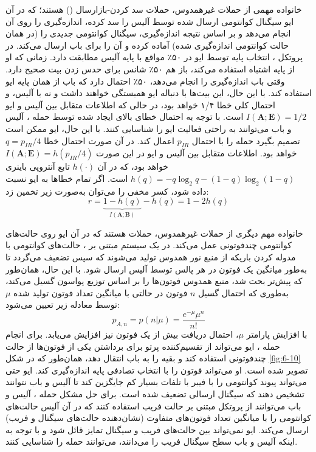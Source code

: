 خانواده مهمی از حملات غیرهمدوس، حملات سد کردن-بازارسال () هستند؛ که در آن ایو سیگنال کوانتومی ارسال شده توسط آلیس را سد کرده، اندازه‌گیری را روی آن انجام می‌دهد و بر اساس نتیجه اندازه‌گیری، سیگنال کوانتومی جدیدی را (در همان  حالت کوانتومی اندازه‌گیری شده) آماده کرده و آن را برای باب ارسال می‌کند. در پروتکل ، انتخاب پایه توسط ایو در ۵۰٪ مواقع با پایه آلیس مطابقت دارد. زمانی که او از پایه اشتباه استفاده می‌کند، باز هم ۵۰٪ شانس برای حدس زدن بیت صحیح دارد. وقتی باب اندازه‌گیری را انجام می‌دهد، ۵۰٪ احتمال دارد که باب از همان پایه ایو استفاده کند. با این حال، این بیت‌ها با دنباله ایو همبستگی خواهند داشت و نه با آلیس، و احتمال کلی خطا ۱/۴ خواهد بود، در حالی که اطلاعات متقابل بین آلیس و ایو $I(\bm{A}; \bm{E}) = 1/2$ است. با توجه به احتمال خطای بالای ایجاد شده توسط حمله ، آلیس و باب می‌توانند به راحتی فعالیت ایو را شناسایی کنند. با این حال، ایو ممکن است تصمیم بگیرد حمله  را با احتمال $p_{IR}$ اعمال کند. در آن صورت احتمال خطا $q = p_{IR}/4$ خواهد بود. اطلاعات متقابل بین آلیس و ایو در این صورت $I(\bm{A}; \bm{E}) = h(p_{IR}/4)$ خواهد بود، که در آن $h(\cdot)$ تابع آنتروپی باینری $h(q) = -q \log_2 q - (1-q) \log_2 (1-q)$ است. اگر تمام خطاها به ایو نسبت داده شود، کسر مخفی را می‌توان به‌صورت زیر تخمین زد:
\begin{equation}
	r = \underbrace{1 - h(q)}_{I(\bm{A}; \bm{B})} - h(q) = 1 - 2h(q)
	\label{eq:6-28}
\end{equation}

خانواده مهم دیگری از حملات غیرهمدوس، حملات  هستند \cite{51} که در آن ایو روی حالت‌های کوانتومی چندفوتونی عمل می‌کند. در یک سیستم  مبتنی بر ، حالت‌های کوانتومی با مدوله کردن باریکه از منبع نور همدوس تولید می‌شوند که سپس تضعیف می‌گردد تا به‌طور میانگین یک فوتون در هر پالس توسط آلیس ارسال شود. با این حال، همان‌طور که پیش‌تر بحث شد، منبع همدوس فوتون‌ها را بر اساس توزیع پواسون گسیل می‌کند، به‌طوری که احتمال گسیل $n$ فوتون در حالتی با میانگین تعداد فوتون تولید شده $\mu$ توسط معادله زیر تعیین می‌شود:
\begin{equation}
	p_{A,n} = p(n|\mu) = \frac{e^{-\mu} \mu^n}{n!}
	\label{eq:6-29}
\end{equation}
با افزایش پارامتر $\mu$، احتمال دریافت بیش از یک فوتون نیز افزایش می‌یابد. برای انجام حمله ، ایو می‌تواند از تقسیم‌کننده پرتو برای برداشتن یکی از فوتون‌ها از حالت چندفوتونی استفاده کند و بقیه را به باب انتقال دهد، همان‌طور که در شکل \ref{fig:6-10} تصویر شده است. او می‌تواند فوتون را با انتخاب تصادفی پایه اندازه‌گیری کند. ایو حتی می‌تواند پیوند کوانتومی را با فیبر با تلفات بسیار کم جایگزین کند تا آلیس و باب نتوانند تشخیص دهند که سیگنال ارسالی تضعیف شده است. برای حل مشکل حمله ، آلیس و باب می‌توانند از پروتکل مبتنی بر حالت فریب \cite{37} استفاده کنند که در آن آلیس حالت‌های کوانتومی را با میانگین تعداد فوتون‌های متفاوت (نشان‌دهنده حالت‌های سیگنال و فریب) ارسال می‌کند. ایو نمی‌تواند بین حالت‌های فریب و سیگنال تمایز قائل شود و با توجه به اینکه آلیس و باب سطح سیگنال فریب را می‌دانند، می‌توانند حمله  را شناسایی کنند.


